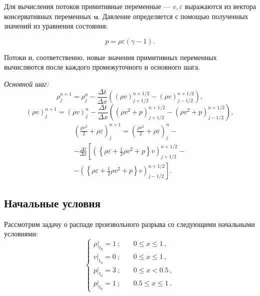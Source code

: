 \documentclass[a4paper]{article}
\begin{document}
	Для вычисления потоков примитивные переменные --- $v, \varepsilon$ выражаются из вектора консервативных переменных $\mathbf{u}$. Давление определяется с помощью полученных значений из уравнения состояния:
	
	\begin{equation}
		p = \rho \varepsilon (\gamma -1).
	\end{equation}
	
	Потоки и, соответственно, новые значения примитивных переменных вычисляются после каждого промежуточного и основного шага.
	
	\textit{Основной шаг:}
	\begin{equation}\label{HydroMain1}
	\rho_{j}^{n+1} = \rho_{j}^{n} - \frac{\Delta t}{\Delta x} \left(
		(\rho v)_{j+1/2}^{n+1/2} - (\rho v)_{j-1/2}^{n+1/2}				 \right) , 
	\end{equation}
	\begin{equation}\label{HydroMain2}
	(\rho v)_{j}^{n+1} = (\rho v)_{j}^{n} - \frac{\Delta t}{\Delta x} \left(
		(\rho v^2 + p)_{j+1/2}^{n+1/2} - (\rho v^2 + p)_{j-1/2}^{n+1/2}				 \right) ,
	\end{equation}
	\begin{multline}\label{HydroMain3}
		\left(\frac{\rho v^2}{2} + \rho \varepsilon	\right)_{j}^{n+1} = 
		\left(\frac{\rho v^2}{2} + \rho \varepsilon	\right)_{j}^{n} -
		\\ - \frac{\Delta t}{\Delta x} \left[
		\left(\left\{\rho \varepsilon + \frac{1}{2}\rho v^2 + p\right\}v\right)_{j+1/2}^{n+1/2} - \right. 
		\\\left. - \left(\left\{\rho \varepsilon + \frac{1}{2}\rho v^2 + p\right\}v\right)_{j-1/2}^{n+1/2} \right] .
	\end{multline}
	\subsection{Начальные условия}
	Рассмотрим задачу о распаде произвольного разрыва со следующими начальными условиями:
	\begin{equation}
	\begin{cases}
		\left.\rho \right|_{t_0} = 1 \:;		&\quad		0 \leqslant x \leqslant 1 \, ,	\\
		\left. v   \right|_{t_0} = 0 \:;		&\quad		0 \leqslant x \leqslant 1 \, ,	\\
		\left. p   \right|_{t_0} = 3 \:;		&\quad		0 \leqslant x < 0.5 \, ,	\\
		\left. p   \right|_{t_0} = 1 \:;		&\quad		0.5 \leqslant x \leqslant 1 \, .	
	\end{cases}
	\end{equation}	
	
\end{document}
